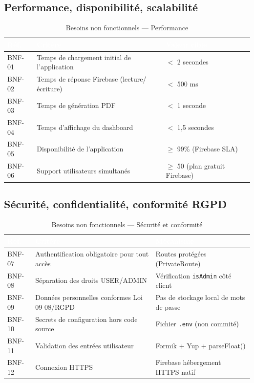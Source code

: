 \documentclass[12pt,a4paper]{report}
\begin{document}
\subsection{Performance, disponibilité, scalabilité}

\begin{table}[H]
\centering
\caption{Besoins non fonctionnels — Performance}
\label{tab:bnf_perf}
\begin{tabularx}{\textwidth}{|l|X|l|}
\hline
\rowcolor{emsiblue}\textcolor{white}{\textbf{Réf.}} & \textcolor{white}{\textbf{Critère}} & \textcolor{white}{\textbf{Valeur cible}} \\
\hline
BNF-01 & Temps de chargement initial de l'application & $<$ 2 secondes \\
BNF-02 & Temps de réponse Firebase (lecture/écriture) & $<$ 500 ms \\
BNF-03 & Temps de génération PDF & $<$ 1 seconde \\
BNF-04 & Temps d'affichage du dashboard & $<$ 1,5 secondes \\
BNF-05 & Disponibilité de l'application & $\geq$ 99\% (Firebase SLA) \\
BNF-06 & Support utilisateurs simultanés & $\geq$ 50 (plan gratuit Firebase) \\
\hline
\end{tabularx}
\end{table}

\subsection{Sécurité, confidentialité, conformité RGPD}

\begin{table}[H]
\centering
\caption{Besoins non fonctionnels — Sécurité et conformité}
\label{tab:bnf_secu}
\begin{tabularx}{\textwidth}{|l|X|l|}
\hline
\rowcolor{emsiblue}\textcolor{white}{\textbf{Réf.}} & \textcolor{white}{\textbf{Critère}} & \textcolor{white}{\textbf{Mécanisme}} \\
\hline
BNF-07 & Authentification obligatoire pour tout accès & Routes protégées (PrivateRoute) \\
BNF-08 & Séparation des droits USER/ADMIN & Vérification \texttt{isAdmin} côté client \\
BNF-09 & Données personnelles conformes Loi 09-08/RGPD & Pas de stockage local de mots de passe \\
BNF-10 & Secrets de configuration hors code source & Fichier \texttt{.env} (non commité) \\
BNF-11 & Validation des entrées utilisateur & Formik + Yup + parseFloat() \\
BNF-12 & Connexion HTTPS & Firebase hébergement HTTPS natif \\
\hline
\end{tabularx}
\end{table}
\end{document}
